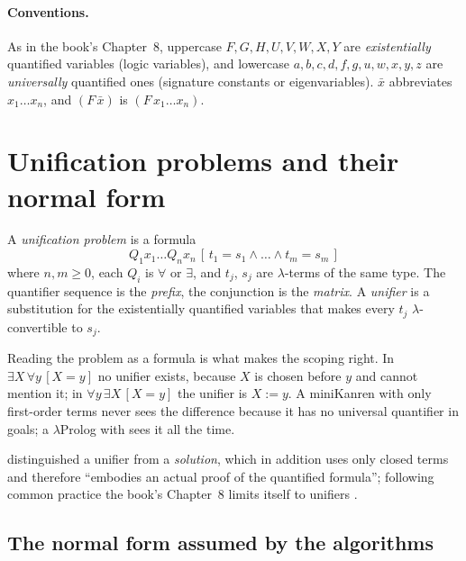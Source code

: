 \paragraph{Conventions.} As in the book's Chapter~8, uppercase $F,G,H,\allowbreak U,V,W,\allowbreak X,Y$ are \emph{existentially}
quantified variables (logic variables), and lowercase $a,b,c,d,\allowbreak f,g,u,\allowbreak w,x,y,z$ are \emph{universally}
quantified ones (signature constants or eigenvariables). $\bar x$ abbreviates $x_1\dots x_n$, and $(F\,\bar x)$
is $(F\,x_1\dots x_n)$.

\section{Unification problems and their normal form}\label{sec:hounif-problems}

\begin{definition}\label{def:hounif-problem}
A \emph{unification problem} is a formula
\[
  Q_1x_1\dots Q_nx_n\,[\,t_1=s_1\wedge\dots\wedge t_m=s_m\,]
\]
where $n,m\ge 0$, each $Q_i$ is $\forall$ or $\exists$, and $t_j$, $s_j$ are $\lambda$-terms of the same type. The
quantifier sequence is the \emph{prefix}, the conjunction is the \emph{matrix}. A \emph{unifier} is a substitution
for the existentially quantified variables that makes every $t_j$ $\lambda$-convertible to $s_j$.
\end{definition}

Reading the problem as a formula is what makes the scoping right. In $\exists X\,\forall y\,[X=y]$ no unifier
exists, because $X$ is chosen before $y$ and cannot mention it; in $\forall y\,\exists X\,[X=y]$ the unifier is
$X:=y$. A miniKanren with only first-order terms never sees the difference because it has no universal
quantifier in goals; a $\lambda$Prolog with  sees it all the time.

 distinguished a unifier from a \emph{solution}, which in addition uses only closed terms and
therefore \enquote{embodies an actual proof of the quantified formula}; following common practice the book's
Chapter~8 limits itself to unifiers .

\subsection{The normal form assumed by the algorithms}

